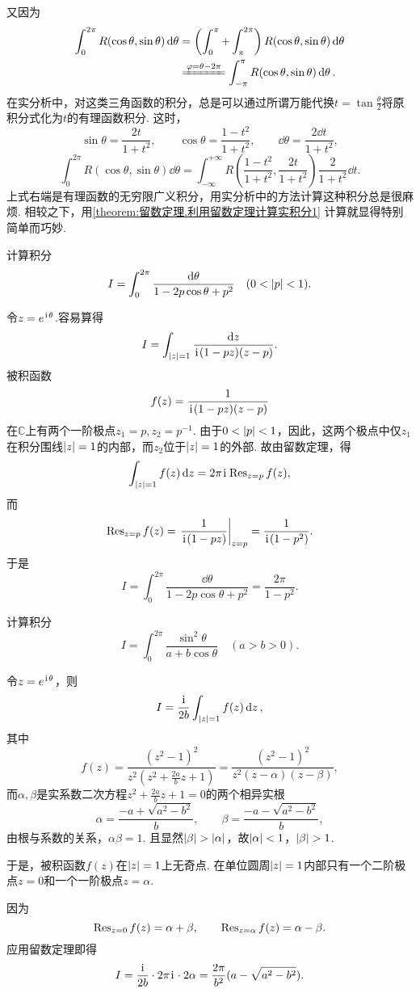 又因为\begin{align*}
\int_0^{2\pi} R(\cos\theta,\sin\theta) \dd{\theta}
&= \left( \int_0^{\pi} + \int_{\pi}^{2\pi} \right) R(\cos\theta,\sin\theta) \dd{\theta} \\
&\xlongequal{\varphi=\theta-2\pi} \int_{-\pi}^{\pi} R(\cos\theta,\sin\theta) \dd{\theta}.
\end{align*}
在实分析中，对这类三角函数的积分，总是可以通过所谓万能代换\(t = \tan\frac{\theta}{2}\)将原积分式化为\(t\)的有理函数积分.
这时，\[
\sin\theta = \frac{2t}{1+t^2},
\qquad
\cos\theta = \frac{1-t^2}{1+t^2},
\qquad
\dd{\theta} = \frac{2 \dd{t}}{1+t^2},
\]\[
\int_0^{2\pi} R(\cos\theta,\sin\theta) \dd{\theta}
= \int_{-\infty}^{+\infty} R\left(\frac{1-t^2}{1+t^2},\frac{2t}{1+t^2}\right) \frac{2}{1+t^2} \dd{t}.
\]上式右端是有理函数的无穷限广义积分，用实分析中的方法计算这种积分总是很麻烦.
相较之下，用\cref{theorem:留数定理.利用留数定理计算实积分1} 计算就显得特别简单而巧妙.

\begin{example}[泊松积分]\label{example:留数定理.泊松积分}
计算积分\[
I = \int_0^{2\pi} \frac{\dd{\theta}}{1-2p\cos\theta+p^2} \quad(0<\abs{p}<1).
\]
\begin{solution}
令\(z=e^{\kern1pt\mathrm{i}\kern1pt\theta}\).容易算得\[
I = \int_{\abs{z}=1} \frac{\dd{z}}{\kern1pt\mathrm{i}\kern1pt(1-pz)(z-p)}.
\]被积函数\[
f(z) = \frac{1}{\kern1pt\mathrm{i}\kern1pt(1-pz)(z-p)}
\]在\(\mathbb{C}\)上有两个一阶极点\(z_1=p, z_2=p^{-1}\).
由于\(0<\abs{p}<1\)，因此，这两个极点中仅\(z_1\)在积分围线\(\abs{z}=1\)的内部，而\(z_2\)位于\(\abs{z}=1\)的外部.
故由留数定理，得\[
\int_{\abs{z}=1} f(z) \dd{z}
= 2\pi\kern1pt\mathrm{i}\kern1pt \operatorname{Res}_{z=p} f(z),
\]而\[
\Res_{z=p} f(z)
= \eval{ \frac{1}{\iu(1-pz)} }_{z=p}
= \frac{1}{\iu(1-p^2)}.
\]于是\[
I = \int_0^{2\pi} \frac{\dd{\theta}}{1-2p\cos\theta+p^2}
= \frac{2\pi}{1-p^2}.
\]
\end{solution}
\end{example}

\begin{example}
计算积分\[
I = \int_0^{2\pi} \frac{\sin^2 \theta}{a+b\cos\theta} \quad(a>b>0).
\]
\begin{solution}
令\(z=e^{\kern1pt\mathrm{i}\kern1pt\theta}\)，则\[
I = \frac{\kern1pt\mathrm{i}\kern1pt}{2b} \int_{\abs{z}=1} f(z) \dd{z},
\]其中\[
f(z) = \frac{(z^2-1)^2}{z^2 \left(z^2+\frac{2a}{b}z+1\right)}
= \frac{(z^2-1)^2}{z^2(z-\alpha)(z-\beta)},
\]而\(\alpha,\beta\)是实系数二次方程\(z^2+\frac{2a}{b}z+1=0\)的两个相异实根\[
\alpha=\frac{-a+\sqrt{a^2-b^2}}{b},
\qquad
\beta=\frac{-a-\sqrt{a^2-b^2}}{b},
\]由根与系数的关系，\(\alpha\beta=1\).
且显然\(\abs{\beta}>\abs{\alpha}\)，故\(\abs{\alpha}<1\)，\(\abs{\beta}>1\).

于是，被积函数\(f(z)\)在\(\abs{z}=1\)上无奇点.
在单位圆周\(\abs{z}=1\)内部只有一个二阶极点\(z=0\)和一个一阶极点\(z=\alpha\).

因为\[
\operatorname{Res}_{z=0} f(z) = \alpha+\beta,
\qquad
\operatorname{Res}_{z=\alpha} f(z) = \alpha-\beta.
\]应用留数定理即得\[
I = \frac{\kern1pt\mathrm{i}\kern1pt}{2b} \cdot 2\pi\kern1pt\mathrm{i}\kern1pt \cdot 2\alpha
= \frac{2\pi}{b^2} (a-\sqrt{a^2-b^2}).
\]
\end{solution}
\end{example}

